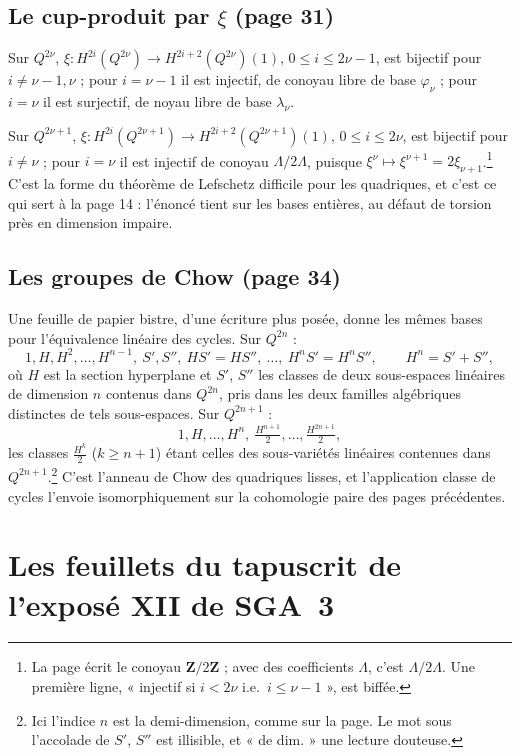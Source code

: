 \documentclass[11pt,a4paper]{article}
\begin{document}
\subsection*{Le cup-produit par $\xi$ (page 31)}

Sur $Q^{2\nu}$, $\xi : H^{2i}(Q^{2\nu}) \to H^{2i+2}(Q^{2\nu})(1)$,
$0 \leq i \leq 2\nu - 1$, est bijectif pour $i \neq \nu - 1, \nu$ ; pour
$i = \nu - 1$ il est injectif, de conoyau libre de base $\varphi_{\nu}$ ;
pour $i = \nu$ il est surjectif, de noyau libre de base $\lambda_{\nu}$.

Sur $Q^{2\nu+1}$, $\xi : H^{2i}(Q^{2\nu+1}) \to H^{2i+2}(Q^{2\nu+1})(1)$,
$0 \leq i \leq 2\nu$, est bijectif pour $i \neq \nu$ ; pour $i = \nu$ il est
injectif de conoyau $\Lambda/2\Lambda$, puisque $\xi^{\nu} \mapsto
\xi^{\nu+1} = 2\xi_{\nu+1}$.\footnote{La page écrit le conoyau
$\mathbf{Z}/2\mathbf{Z}$ ; avec des coefficients $\Lambda$, c'est
$\Lambda/2\Lambda$. Une première ligne, « injectif si $i < 2\nu$ i.e.\
$i \leq \nu - 1$ », est biffée.} C'est la forme du théorème de Lefschetz
difficile pour les quadriques, et c'est ce qui sert à la page 14 :
l'énoncé tient sur les bases entières, au défaut de torsion près en
dimension impaire.

\subsection*{Les groupes de Chow (page 34)}

Une feuille de papier bistre, d'une écriture plus posée, donne les mêmes
bases pour l'équivalence linéaire des cycles. Sur $Q^{2n}$ :
\[
  1, H, H^{2}, \ldots, H^{n-1}, \ S', S'', \ HS' = HS'', \ \ldots, \
  H^{n}S' = H^{n}S'', \qquad H^{n} = S' + S'',
\]
où $H$ est la section hyperplane et $S'$, $S''$ les classes de deux
sous-espaces linéaires de dimension $n$ contenus dans $Q^{2n}$, pris dans
les deux familles algébriques distinctes de tels sous-espaces. Sur
$Q^{2n+1}$ :
\[
  1, H, \ldots, H^{n}, \ \tfrac{H^{n+1}}{2}, \ldots, \tfrac{H^{2n+1}}{2},
\]
les classes $\tfrac{H^{k}}{2}$ ($k \geq n+1$) étant celles des sous-variétés
linéaires contenues dans $Q^{2n+1}$.\footnote{Ici l'indice $n$ est la
demi-dimension, comme sur la page. Le mot sous l'accolade de $S'$, $S''$
est illisible, et « de dim. » une lecture douteuse.} C'est l'anneau
de Chow des quadriques lisses, et l'application classe de cycles l'envoie
isomorphiquement sur la cohomologie paire des pages précédentes.

\section*{Les feuillets du tapuscrit de l'exposé XII de SGA~3}
\end{document}
